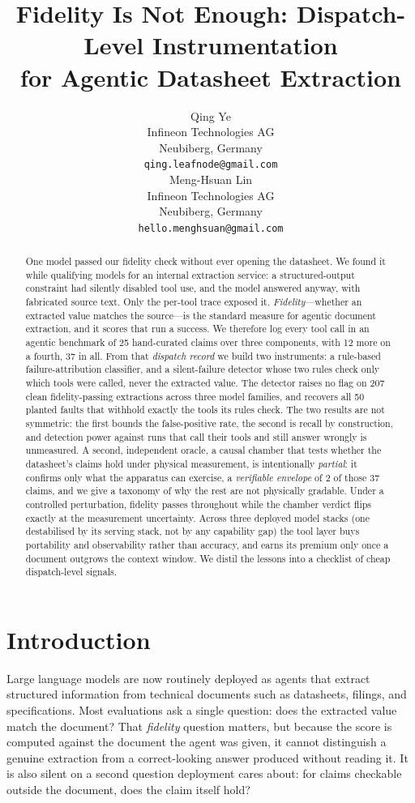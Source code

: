 \documentclass[11pt]{article}
\title{Fidelity Is Not Enough: Dispatch-Level Instrumentation\\
for Agentic Datasheet Extraction}
\author{
  Qing Ye \\
  Infineon Technologies AG \\
  Neubiberg, Germany \\
  \texttt{qing.leafnode@gmail.com} \\\And
  Meng-Hsuan Lin \\
  Infineon Technologies AG \\
  Neubiberg, Germany \\
  \texttt{hello.menghsuan@gmail.com}}
\begin{document}
\maketitle

\begin{abstract}
One model passed our fidelity check without ever opening the datasheet.
We found it while qualifying models for an internal extraction service:
a structured-output constraint had silently disabled tool use, and the
model answered anyway, with fabricated source text. Only the per-tool
trace exposed it. \emph{Fidelity}---whether an extracted value matches
the source---is the standard measure for agentic document extraction,
and it scores that run a success. We therefore log every tool call in
an agentic benchmark of 25 hand-curated claims over three components,
with 12 more on a fourth, 37 in all. From that \emph{dispatch record}
we build two instruments: a rule-based failure-attribution classifier,
and a silent-failure detector whose two rules check only which tools
were called, never the extracted value. The detector
raises no flag on 207 clean fidelity-passing extractions across three
model families, and recovers all 50 planted faults that withhold exactly
the tools its rules check. The two results are not symmetric: the first
bounds the false-positive rate, the second is recall by construction, and
detection power against runs that call their tools and still answer
wrongly is unmeasured. A second, independent oracle, a causal chamber
that tests whether the datasheet's claims hold under physical
measurement, is intentionally \emph{partial}: it confirms only what the
apparatus can exercise, a \emph{verifiable envelope} of 2 of those 37
claims, and we give a taxonomy of why the rest are not physically
gradable. Under a controlled perturbation, fidelity passes throughout
while the chamber verdict flips exactly at the measurement uncertainty.
Across three deployed model stacks (one destabilised by its serving
stack, not by any capability gap) the tool layer buys portability and
observability rather than accuracy, and earns its premium only once a
document outgrows the context window. We distil the lessons into a
checklist of cheap dispatch-level signals.
\end{abstract}

\section{Introduction}
\label{sec:intro}

Large language models are now routinely deployed as agents that extract
structured information from technical documents such as datasheets,
filings, and specifications. Most evaluations ask a single question:
does the extracted value match the document? That \emph{fidelity}
question matters, but because the score is computed against the
document the agent was given, it cannot distinguish a genuine
extraction from a correct-looking answer produced without reading it. It is also silent
on a second question deployment cares about: for claims checkable
outside the document, does the claim itself hold?
\end{document}
